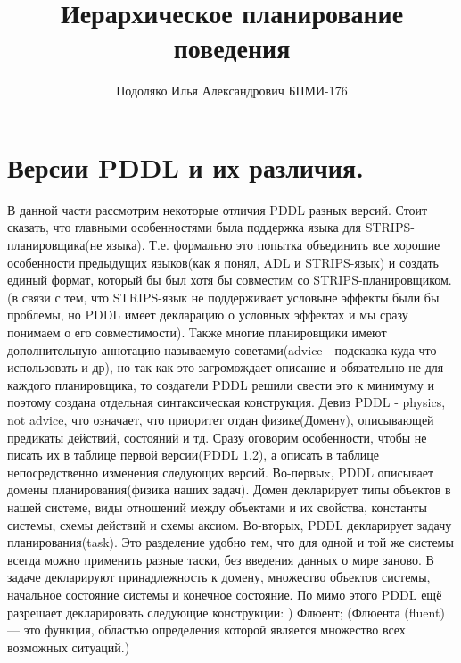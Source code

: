 \documentclass{article}
\title{Иерархическое планирование поведения}
\author{Подоляко Илья Александрович БПМИ-176}
\date{}
\begin{document}
\maketitle



\section*{Версии PDDL и их различия.}

В данной части рассмотрим некоторые отличия PDDL разных версий. Стоит сказать, что главными особенностями была поддержка языка для STRIPS-планировщика(не языка). Т.е. формально это попытка объединить все хорошие особенности предыдущих языков(как я понял, ADL и STRIPS-язык) и создать единый формат, который бы был хотя бы совместим со STRIPS-планировщиком.(в связи с тем, что STRIPS-язык не поддерживает условыне эффекты были бы проблемы, но PDDL имеет декларацию о условных эффектах и мы сразу понимаем о его совместимости). Также многие планировщики имеют дополнительную аннотацию называемую советами(advice - подсказка куда что использовать и др), но так как это загромождает описание и обязательно не для каждого планировщика, то создатели PDDL решили свести это к минимуму и поэтому создана отдельная синтаксическая конструкция. Девиз PDDL - physics, not advice, что означает, что приоритет отдан физике(Домену), описывающей предикаты действий, состояний и тд. \newline 
Сразу оговорим особенности, чтобы не писать их в таблице первой версии(PDDL 1.2), а описать в таблице непосредственно изменения следующих версий. \newline
Во-первыx, PDDL описывает домены планирования(физика наших задач). Домен декларирует типы объектов в нашей системе, виды отношений между объектами и их свойства, константы системы, схемы действий и схемы аксиом. \newline
Во-вторых, PDDL декларирует задачу планирования(task). Это разделение удобно тем, что для одной и той же системы всегда можно применить разные таски, без введения данных о мире заново. В задаче декларируют принадлежность к домену, множество объектов системы, начальное состояние системы и конечное состояние. \newline
По мимо этого PDDL ещё разрешает декларировать следующие конструкции: ) Флюент; (Флюента (fluent) — это функция, областью определения которой является множество всех возможных ситуаций.) \newline
\end{document}
